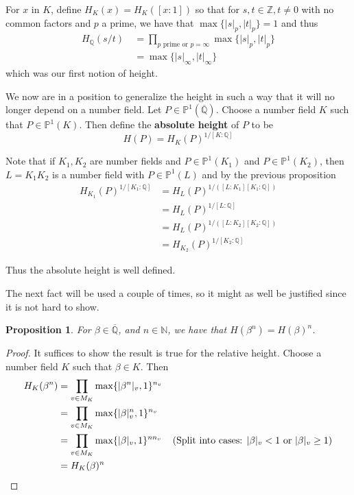 \documentclass{amsart}
\newtheorem{prop}[thm]{Proposition}
\newcommand{\N}{\mathbb{N}}
\newcommand{\Z}{\mathbb{Z}}
\newcommand{\Q}{\mathbb{Q}}
\renewcommand{\P}{\mathbb{P}}
\begin{document}
For $x$ in $K$, define $H_K(x) = H_K([x:1])$ so that for $s,t \in \Z, t \neq 0$ with no common factors and $p$ a prime, we have that $\max\{|s|_p,|t|_p\} = 1$ and thus 
\begin{align*}
H_\Q(s/t) \
&= \prod_{p \text{ prime or } p = \infty}\max\{|s|_p,|t|_p\}\\
&= \max\{|s|_\infty,|t|_\infty\}
\end{align*} 
which was our first notion of height.

We now are in a position to generalize the height in such a way that it will no longer depend on a number field. Let $P \in \P^1(\overline{\Q})$. Choose a number field $K$ such that $P \in \P^1(K)$. Then define the \textbf{absolute height} of $P$ to be $$H(P) = H_K(P)^{1/[K:\Q]}$$

Note that if $K_1,K_2$ are number fields and $P \in \P^1(K_1)$ and $P \in \P^1(K_2)$, then $L = K_1K_2$ is a number field with $P \in \P^1(L)$ and by the previous proposition
\begin{align*}
H_{K_1}(P)^{1/[K_1:\Q]} 
&= H_L(P)^{1/([L:K_1][K_1:\Q])}\\
&= H_L(P)^{1/[L:\Q]}\\
&= H_L(P)^{1/([L:K_2][K_2:\Q])}\\
&= H_{K_2}(P)^{1/[K_2:\Q]}
\end{align*}

\noindent Thus the absolute height is well defined. 

The next fact will be used a couple of times, so it might as well be justified since it is not hard to show.

\begin{prop}
For $\beta \in \overline{\Q}$, and $n \in \N$, we have that $H(\beta^n) = H(\beta)^n$.

\end{prop}

\begin{proof}
It suffices to show the result is true for the relative height. Choose a number field $K$ such that $\beta \in K$. Then \begin{align*}
H_K(\beta^n) 
&= \prod_{v \in M_K}\max\{|\beta^n|_{v}, 1\}^{n_{v}}\\
&= \prod_{v \in M_K}\max\{|\beta|_{v}^n, 1\}^{n_{v}}\\
&= \prod_{v \in M_K}\max\{|\beta|_{v}, 1\}^{nn_{v}} \hspace{4mm} (\text{Split into cases: }|\beta|_{v} < 1 \text{ or }|\beta|_{v} \geq 1)\\
&= H_K(\beta)^n
\end{align*}
\end{proof}
\end{document}
